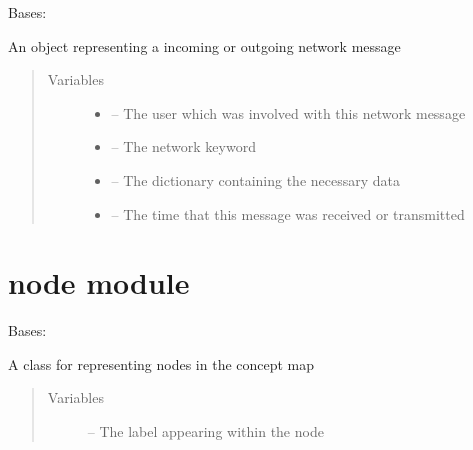 \documentclass[letterpaper,10pt,english]{sphinxmanual}
\begin{document}
\begin{fulllineitems}
\label{\detokenize{logentry:logentry.LogEntry}}
Bases: 

An object representing a incoming or outgoing network message
\begin{quote}\begin{description}
\item[{Variables}] \leavevmode\begin{itemize}
\item {} 
{\hyperref[\detokenize{user:module-user}]{}} -- The user which was involved with this network message

\item {} 
\href{https://docs.python.org/2/library/keyword.html\#module-keyword}{} -- The network keyword

\item {} 
 -- The dictionary containing the necessary data

\item {} 
 -- The time that this message was received or transmitted

\end{itemize}

\end{description}\end{quote}

\end{fulllineitems}



\chapter{node module}
\label{\detokenize{node:node-module}}\label{\detokenize{node::doc}}\label{\detokenize{node:module-node}}

\begin{fulllineitems}
\label{\detokenize{node:node.Node}}
Bases: 

A class for representing nodes in the concept map
\begin{quote}\begin{description}
\item[{Variables}] \leavevmode
{} -- The label appearing within the node

\end{description}\end{quote}

\end{fulllineitems}
\end{document}
